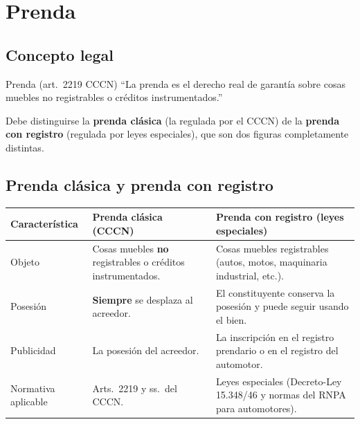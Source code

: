 \documentclass[12pt,oneside]{book}
\begin{document}
\chapter[Prenda]{Prenda}

\section{Concepto legal}

\begin{definition}{Prenda (art.\ 2219 CCCN)}
``La prenda es el derecho real de garantía sobre cosas muebles no registrables o créditos instrumentados.''
\end{definition}

Debe distinguirse la \textbf{prenda clásica} (la regulada por el CCCN) de la \textbf{prenda con registro} (regulada por leyes especiales), que son dos figuras completamente distintas.

\section{Prenda clásica y prenda con registro}

\begin{table}[H]
\centering
\begin{tabularx}{\textwidth}{
    >{\raggedright\arraybackslash}p{}
    >{\raggedright\arraybackslash}X
    >{\raggedright\arraybackslash}X
}
\toprule
\textbf{Característica} & \textbf{Prenda clásica (CCCN)} & \textbf{Prenda con registro (leyes especiales)} \\
\midrule
Objeto & Cosas muebles \textbf{no} registrables o créditos instrumentados. & Cosas muebles registrables (autos, motos, maquinaria industrial, etc.). \\
Posesión & \textbf{Siempre} se desplaza al acreedor. & El constituyente conserva la posesión y puede seguir usando el bien. \\
Publicidad & La posesión del acreedor. & La inscripción en el registro prendario o en el registro del automotor. \\
Normativa aplicable & Arts.\ 2219 y ss.\ del CCCN. & Leyes especiales (Decreto-Ley 15.348/46 y normas del RNPA para automotores). \\
\bottomrule
\end{tabularx}
\end{table}
\end{document}
